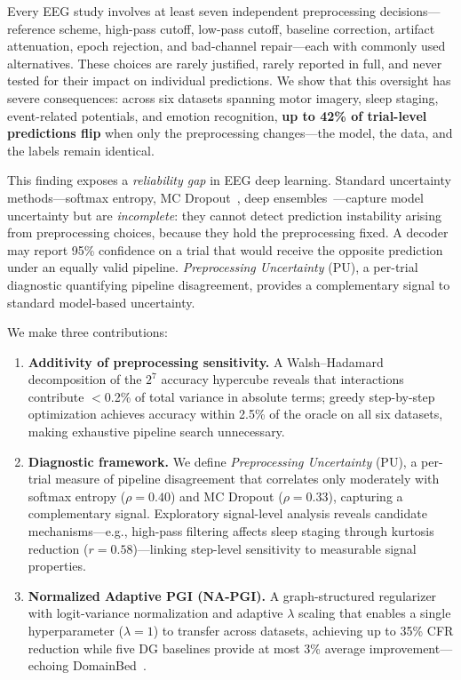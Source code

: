 \documentclass{article}
\begin{document}
Every EEG study involves at least seven independent preprocessing decisions---reference scheme, high-pass cutoff, low-pass cutoff, baseline correction, artifact attenuation, epoch rejection, and bad-channel repair---each with commonly used alternatives. These choices are rarely justified, rarely reported in full, and never tested for their impact on individual predictions. We show that this oversight has severe consequences: across six datasets spanning motor imagery, sleep staging, event-related potentials, and emotion recognition, \textbf{up to 42\% of trial-level predictions flip} when only the preprocessing changes---the model, the data, and the labels remain identical.

This finding exposes a \emph{reliability gap} in EEG deep learning. Standard uncertainty methods---softmax entropy, MC Dropout~\citep{gal2016dropout}, deep ensembles~\citep{lakshminarayanan2017simple}---capture model uncertainty but are \emph{incomplete}: they cannot detect prediction instability arising from preprocessing choices, because they hold the preprocessing fixed. A decoder may report 95\% confidence on a trial that would receive the opposite prediction under an equally valid pipeline. \emph{Preprocessing Uncertainty} (PU), a per-trial diagnostic quantifying pipeline disagreement, provides a complementary signal to standard model-based uncertainty.

We make three contributions:

\begin{enumerate}[nosep,leftmargin=*]
\item \textbf{Additivity of preprocessing sensitivity.} A Walsh--Hadamard decomposition of the $2^7$ accuracy hypercube reveals that interactions contribute $<$0.2\% of total variance in absolute terms; greedy step-by-step optimization achieves accuracy within 2.5\% of the oracle on all six datasets, making exhaustive pipeline search unnecessary.
\item \textbf{Diagnostic framework.} We define \emph{Preprocessing Uncertainty} (PU), a per-trial measure of pipeline disagreement that correlates only moderately with softmax entropy ($\rho{=}0.40$) and MC Dropout ($\rho{=}0.33$), capturing a complementary signal. Exploratory signal-level analysis reveals candidate mechanisms---e.g., high-pass filtering affects sleep staging through kurtosis reduction ($r{=}0.58$)---linking step-level sensitivity to measurable signal properties.
\item \textbf{Normalized Adaptive PGI (NA-PGI).} A graph-structured regularizer with logit-variance normalization and adaptive $\lambda$ scaling that enables a single hyperparameter ($\lambda{=}1$) to transfer across datasets, achieving up to 35\% CFR reduction while five DG baselines provide at most 3\% average improvement---echoing DomainBed~\citep{gulrajani2021search}.
\end{enumerate}
\end{document}
